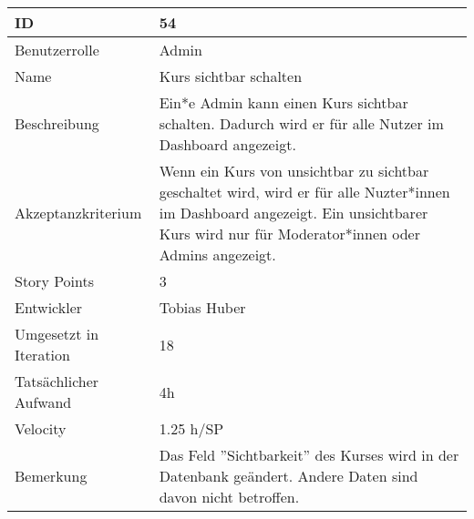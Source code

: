 \begin{tabularx}{\textwidth}{|p{}|X|}
	\hline
	ID & 54\\
	\hline
	Benutzerrolle & Admin\\
	\hline
	Name & Kurs sichtbar schalten\\
	\hline
	Beschreibung & Ein*e Admin kann einen Kurs sichtbar schalten. Dadurch wird er für alle Nutzer im Dashboard angezeigt.\\
	\hline
	Akzeptanzkriterium & Wenn ein Kurs von unsichtbar zu sichtbar geschaltet wird, wird er für alle Nuzter*innen im Dashboard angezeigt. Ein unsichtbarer Kurs wird nur für Moderator*innen oder Admins angezeigt.\\
	\hline
	Story Points & 3\\
	\hline
	Entwickler & Tobias Huber\\
	\hline
	Umgesetzt in Iteration & 18\\
	\hline
	Tatsächlicher Aufwand & 4h\\
	\hline
	Velocity & 1.25 h/SP\\
	\hline
	Bemerkung & Das Feld ''Sichtbarkeit'' des Kurses wird in der Datenbank geändert. Andere Daten sind davon nicht betroffen.\\
	\hline
\end{tabularx}
\vspace{20pt}
